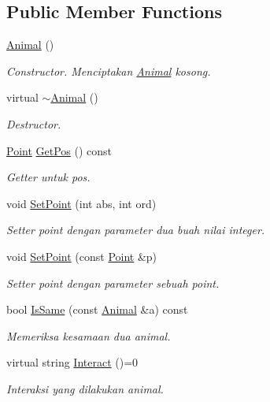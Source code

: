 \subsection*{Public Member Functions}
\begin{DoxyCompactItemize}
\item 
\hyperlink{classAnimal_a1e726a49ec952443190ac62dad22353c}{Animal} ()
\begin{DoxyCompactList}\small\item\em Constructor. Menciptakan \hyperlink{classAnimal}{Animal} kosong. \end{DoxyCompactList}\item 
virtual \hyperlink{classAnimal_a16d8b7f94611cc65f5cdb58cc105527b}{$\sim$\+Animal} ()
\begin{DoxyCompactList}\small\item\em Destructor. \end{DoxyCompactList}\item 
\hyperlink{classPoint}{Point} \hyperlink{classAnimal_a183e4addbbccbe06a77e57bc8893cec1}{Get\+Pos} () const 
\begin{DoxyCompactList}\small\item\em Getter untuk pos. \end{DoxyCompactList}\item 
void \hyperlink{classAnimal_a754c7eb7a8ca6d8bd3e30650546a410d}{Set\+Point} (int abs, int ord)
\begin{DoxyCompactList}\small\item\em Setter point dengan parameter dua buah nilai integer. \end{DoxyCompactList}\item 
void \hyperlink{classAnimal_a02e187a6407bc83c46698544c912be15}{Set\+Point} (const \hyperlink{classPoint}{Point} \&p)
\begin{DoxyCompactList}\small\item\em Setter point dengan parameter sebuah point. \end{DoxyCompactList}\item 
bool \hyperlink{classAnimal_afc66abcbc6efb71c81d5306ea368cffb}{Is\+Same} (const \hyperlink{classAnimal}{Animal} \&a) const 
\begin{DoxyCompactList}\small\item\em Memeriksa kesamaan dua animal. \end{DoxyCompactList}\item 
virtual string \hyperlink{classAnimal_ad5a55fb0355a9425fee6611003d9892c}{Interact} ()=0
\begin{DoxyCompactList}\small\item\em Interaksi yang dilakukan animal. \end{DoxyCompactList}\item 

\end{DoxyCompactItemize}
